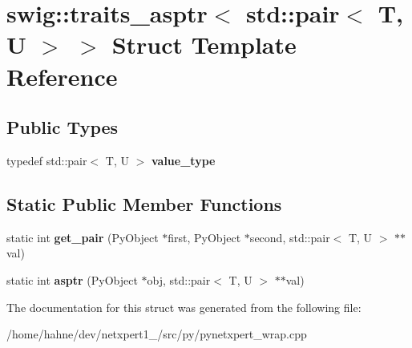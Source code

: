 \hypertarget{structswig_1_1traits__asptr_3_01std_1_1pair_3_01T_00_01U_01_4_01_4}{}\section{swig\+:\+:traits\+\_\+asptr$<$ std\+:\+:pair$<$ T, U $>$ $>$ Struct Template Reference}
\label{structswig_1_1traits__asptr_3_01std_1_1pair_3_01T_00_01U_01_4_01_4}
\subsection*{Public Types}
\begin{DoxyCompactItemize}
\item 
typedef std\+::pair$<$ T, U $>$ {\bfseries value\+\_\+type}\hypertarget{structswig_1_1traits__asptr_3_01std_1_1pair_3_01T_00_01U_01_4_01_4_a1cc2b1f24022176235ac0ede7646c041}{}\label{structswig_1_1traits__asptr_3_01std_1_1pair_3_01T_00_01U_01_4_01_4_a1cc2b1f24022176235ac0ede7646c041}

\end{DoxyCompactItemize}
\subsection*{Static Public Member Functions}
\begin{DoxyCompactItemize}
\item 
static int {\bfseries get\+\_\+pair} (Py\+Object $\ast$first, Py\+Object $\ast$second, std\+::pair$<$ T, U $>$ $\ast$$\ast$val)\hypertarget{structswig_1_1traits__asptr_3_01std_1_1pair_3_01T_00_01U_01_4_01_4_a7ba7929bef6f511c92ff9a847edf9bf0}{}\label{structswig_1_1traits__asptr_3_01std_1_1pair_3_01T_00_01U_01_4_01_4_a7ba7929bef6f511c92ff9a847edf9bf0}

\item 
static int {\bfseries asptr} (Py\+Object $\ast$obj, std\+::pair$<$ T, U $>$ $\ast$$\ast$val)\hypertarget{structswig_1_1traits__asptr_3_01std_1_1pair_3_01T_00_01U_01_4_01_4_a331a484c8263c370bd86a3a2d655614a}{}\label{structswig_1_1traits__asptr_3_01std_1_1pair_3_01T_00_01U_01_4_01_4_a331a484c8263c370bd86a3a2d655614a}

\end{DoxyCompactItemize}


The documentation for this struct was generated from the following file\+:\begin{DoxyCompactItemize}
\item 
/home/hahne/dev/netxpert1\+\_/src/py/pynetxpert\+\_\+wrap.\+cpp\end{DoxyCompactItemize}
